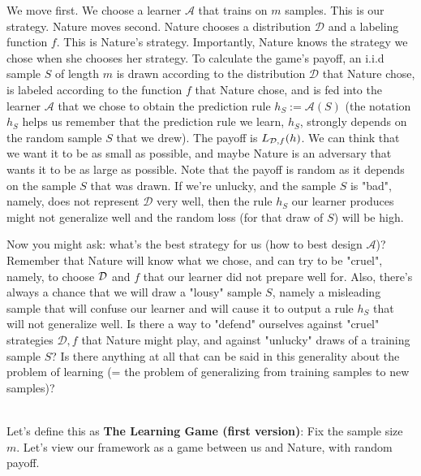\documentclass[11pt]{article}
\begin{document}
{We move first. We choose a learner $\mathcal{A}$ that trains on $m$ samples. This is our strategy.
Nature moves second. Nature chooses a distribution $\mathcal{D}$ and a labeling function $f$. This is Nature's strategy. Importantly, Nature knows the strategy we chose when she chooses her strategy.
To calculate the game's payoff, an i.i.d sample $S$ of length $m$ is drawn according to the distribution $\mathcal{D}$ that Nature chose, is labeled according to the function $f$ that Nature chose, and is fed into the learner $\mathcal{A}$ that we chose to obtain the prediction rule $h_S:=\mathcal{A}(S)$ (the notation $h_S$ helps us remember that the prediction rule we learn, $h_S$, strongly depends on the random sample $S$ that we drew). The payoff is $L_{\mathcal{D},f}(h)$. We can think that we want it to be as small as possible, and maybe Nature is an adversary that wants it to be as large as possible. Note that the payoff is random as it depends on the sample $S$ that was drawn. If we're unlucky, and the sample $S$ is "bad", namely, does not represent $\mathcal{D}$ very well, then the rule $h_S$ our learner produces might not generalize well and the random loss (for that draw of $S$) will be high. 

Now you might ask: what's the best strategy for us (how to best design $\mathcal{A}$)? 
Remember that Nature will know what we chose, and can try to be "cruel", namely, to choose $\mathcal{D}$ and $f$ that our learner did not prepare well for. Also, there's always a chance that we will draw a "lousy" sample $S$, namely a misleading sample that will confuse our learner and will cause it to output a rule $h_S$ that will not generalize well. Is there a way to "defend" ourselves against "cruel" strategies $\mathcal{D},f$ that Nature might play, and against "unlucky" draws of a training sample $S$? Is there anything at all that can be said in this generality about the problem of learning (= the problem of generalizing from training samples to new samples)? 

~\\
Let's define this as {\bf The Learning Game (first version)}:
Fix the sample size $m$. Let's view our framework as a game between us and
  Nature, with random payoff.
  \begin{itemize}
  

\end{itemize}}
\end{document}
